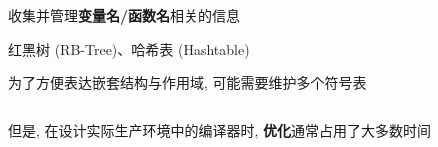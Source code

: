 \begin{frame}{}
  \begin{center}
     收集并管理{\bf 变量名/函数名}相关的信息
  \end{center}

\end{frame}

\begin{frame}{}

  \vspace{0.50cm}
  \begin{center}
    红黑树 (RB-Tree)、哈希表 (Hashtable)
  \end{center}
\end{frame}

\begin{frame}{}
  \begin{center}
    为了方便表达嵌套结构与作用域, 可能需要维护多个符号表
  \end{center}

\end{frame}

\begin{frame}{}
  \begin{center}
  \end{center}

  \begin{columns}
  \end{columns}

  \vspace{0.30cm}
  \begin{center}
    但是, 在设计实际生产环境中的编译器时, {\bf 优化}通常占用了大多数时间
  \end{center}
\end{frame}
